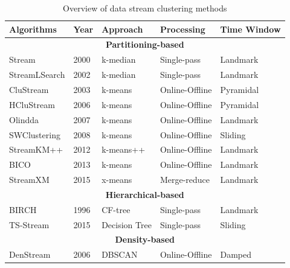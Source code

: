 \begin{table}[!ht]
\centering
\small
\caption{Overview of data stream clustering methods \protect\cite{mansalis2018evaluation}}
\label{landmarkwin}
\begin{tabular}{lllll}
\hline
\textbf{Algorithms} & \textbf{Year} & \textbf{Approach} & \textbf{Processing} & \textbf{Time Window} \\ \hline \midrule
\multicolumn{5}{c}{\cellcolor[HTML]{C0C0C0}\textbf{Partitioning-based}}                              \\ \hline
Stream              & 2000          & k-median          & Single-pass         & Landmark             \\ \hline
StreamLSearch       & 2002          & k-median          & Single-pass         & Landmark             \\ \hline
CluStream           & 2003          & k-means           & Online-Offline      & Pyramidal            \\ \hline
HCluStream          & 2006          & k-means           & Online-Offline      & Pyramidal            \\ \hline
Olindda             & 2007          & k-means           & Online-Offline      & Landmark             \\ \hline
SWClustering        & 2008          & k-means           & Online-Offline      & Sliding              \\ \hline
StreamKM++          & 2012          & k-means++         & Online-Offline      & Landmark             \\ \hline
BICO                & 2013          & k-means           & Online-Offline      & Landmark             \\ \hline
StreamXM            & 2015          & x-means           & Merge-reduce        & Landmark             \\ \hline
\multicolumn{5}{c}{\cellcolor[HTML]{C0C0C0}\textbf{Hierarchical-based}}                              \\ \hline
BIRCH               & 1996          & CF-tree           & Single-pass         & Landmark             \\ \hline
TS-Stream           & 2015          & Decision Tree     & Single-pass         & Sliding              \\ \hline
\multicolumn{5}{c}{\cellcolor[HTML]{C0C0C0}\textbf{Density-based}}                                   \\ \hline
DenStream           & 2006          & DBSCAN            & Online-Offline      & Damped               \\ \hline

\end{tabular}
\end{table}
